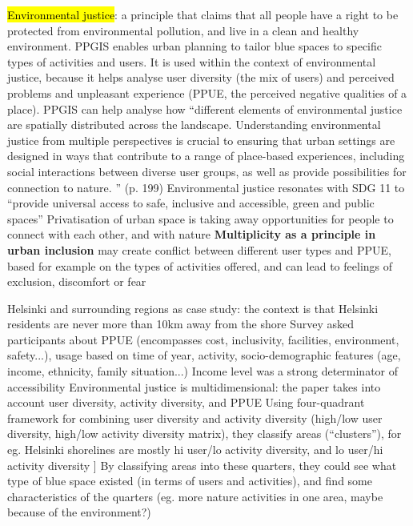\documentclass{article}
\newcommand{\alignedmarginpar}[1]{%
        \marginpar{\raggedright\small #1}
    }
\begin{document}
\begin{outline}
	\1 \hl{Environmental justice}: a principle that claims that all people have a right to be protected from environmental pollution, and live in a clean and healthy environment. 
		\2  PPGIS enables urban planning to tailor blue spaces to specific types of activities and users. It is used within the context of environmental justice, because it helps analyse user diversity (the mix of users) and perceived problems and unpleasant experience (PPUE, the perceived negative qualities of a place). PPGIS can help analyse how ``different elements of environmental justice are spatially distributed across the landscape. Understanding environmental justice from multiple perspectives is crucial to ensuring that urban settings are designed in ways that contribute to a range of place-based experiences, including social interactions between diverse user groups, as well as provide possibilities for connection to nature. '' (p. 199)
		\2 Environmental justice resonates with SDG 11 to ``provide universal access to safe, inclusive and accessible, green and public spaces''
		\2 Privatisation of urban space is taking away opportunities for people to connect with each other, and with nature
		\2 \textbf{Multiplicity as a principle in urban inclusion} may create conflict between different user types and PPUE, based for example on the types of activities offered, and can lead to feelings of exclusion, discomfort or fear\alignedmarginpar{Inclusivity in public space\\Right to blue space}
	\1 Helsinki and surrounding regions as case study: the context is that Helsinki residents are never more than 10km away from the shore
		\2 Survey asked participants about PPUE (encompasses cost, inclusivity, facilities, environment, safety...), usage based on time of year, activity, socio-demographic features (age, income, ethnicity, family situation...)
		\2 Income level was a strong determinator of accessibility
	\1 Environmental justice is multidimensional: the paper takes into account user diversity, activity diversity, and PPUE
		\2 Using four-quadrant framework for combining user diversity and activity diversity (high/low user diversity, high/low activity diversity matrix), they classify areas (``clusters''), for eg. Helsinki shorelines are mostly hi user/lo activity diversity, and lo user/hi activity diversity ]
		\2 By classifying areas into these quarters, they could see what type of blue space existed (in terms of users and activities), and find some characteristics of the quarters (eg. more nature activities in one area, maybe because of the environment?)

\end{outline}
\end{document}
